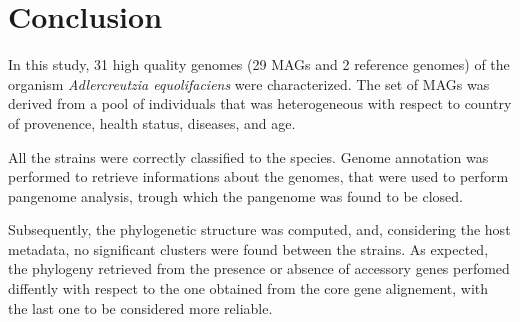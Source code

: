 \clearpage
\section*{Conclusion}

In this study, 31 high quality genomes (29 MAGs and 2 reference genomes)
of the organism \emph{Adlercreutzia equolifaciens} were characterized.
The set of MAGs was derived from a pool of individuals that was heterogeneous
with respect to country of provenence, health status, diseases, and age. 

All the strains were correctly classified to the species. 
Genome annotation was performed to retrieve informations about the genomes, that 
were used to perform pangenome analysis, trough which the pangenome was found to be closed.

Subsequently, the phylogenetic structure was computed, and, considering the host metadata,
no significant clusters were found between the strains. As expected, the phylogeny 
retrieved from the presence or absence of accessory genes perfomed diffently with respect
to the one obtained from the core gene alignement, with the last one to be considered
more reliable. 







